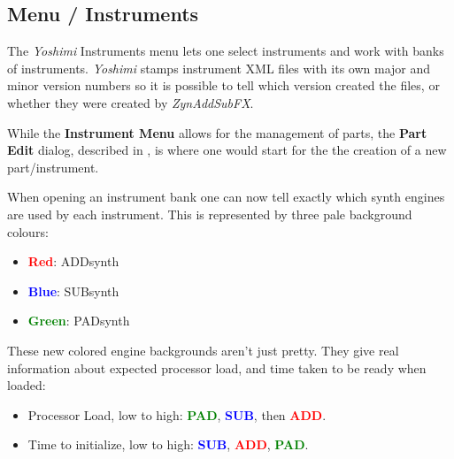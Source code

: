 %
%
%

\subsection{Menu / Instruments}
\label{subsec:menu_instrument}

   The \textsl{Yoshimi} Instruments menu lets one select instruments and work
   with banks of instruments.
   \textsl{Yoshimi} stamps instrument XML files with its own major and minor
   version numbers so it is possible to tell which version created the files,
   or whether they were created by \textsl{ZynAddSubFX}.

   While the \textbf{Instrument Menu} allows for the management of parts, the
   \textbf{Part Edit} dialog, described in
   ,
   is where one would start for the the creation of a new part/instrument.

   When opening an instrument bank one can now tell exactly which synth engines
   are used by each instrument. This is represented by three pale background
   colours:

   \begin{itemize}
      \item \textbf{\textcolor{red}{Red}}: ADDsynth
      \item \textbf{\textcolor{blue}{Blue}}: SUBsynth
      \item \textbf{\textcolor{green}{Green}}: PADsynth
   \end{itemize}

   These new colored engine backgrounds aren't just pretty. They give real
   information about expected processor load, and time taken to be ready when
   loaded:

   \begin{itemize}
      \item Processor Load, low to high:
         \textbf{\textcolor{green}{PAD}},
         \textbf{\textcolor{blue}{SUB}}, then
         \textbf{\textcolor{red}{ADD}}.
      \item Time to initialize, low to high:
         \textbf{\textcolor{blue}{SUB}},
         \textbf{\textcolor{red}{ADD}},
         \textbf{\textcolor{green}{PAD}}.
   \end{itemize}

